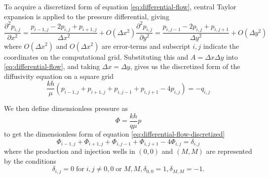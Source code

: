 To acquire a discretized form of equation \eqref{eq:differential-flow}, central Taylor expansion is applied to the pressure differential, giving
\begin{subequations}
    \begin{equation}
        \frac{\partial^2 p_{i,j}}{\partial x^2} = \frac{p_{i-1,j} -2p_{i,j} + p_{i+1,j}}{\Delta x^2} + O(\Delta x^2)
    \end{equation}
    \begin{equation}
        \frac{\partial^2 p_{i,j}}{\partial y^2} = \frac{p_{i,j-1} -2p_{i,j} + p_{i,j+1}}{\Delta y^2} + O(\Delta y^2)
    \end{equation}
\end{subequations}
where $O(\Delta x^2)$ and $O(\Delta x^2)$ are error-terms and subscript $i,j$ indicate the coordinates on the computational grid. Substituting this and $A=\Delta x \Delta y$ into \eqref{eq:differential-flow}, and taking $\Delta x = \Delta y$, gives us the discretized form of the diffusivity equation on a square grid
\begin{equation}
    \label{eq:differential-flow-discretized}
    \frac{kh}{\mu} \left( p_{i-1,j} + p_{i+1,j} + p_{i,j-1} + p_{i,j+1} -4p_{i,j} \right) = -q_{i,j}
\end{equation}

We then define dimensionless pressure as
\begin{equation}
    \label{eq:dimensionless-pressure}
    \Phi = \frac{kh}{q\mu} p
\end{equation}
to get the dimensionless form of equation \eqref{eq:differential-flow-discretized} \cite{Peaceman1978Interpretation}
\begin{equation}
    \label{eq:differential-flow-discretzed-dimensionless}
     \Phi_{i-1,j} + \Phi_{i+1,j} + \Phi_{i,j-1}  + \Phi_{i,j+1} -4 \Phi_{i,j}  = \delta_{i,j}
\end{equation}
where the production and injection wells in $(0,0)$ and $(M,M)$ are represented by the conditions
\begin{subequations}
    \label{eq:well-conditions}
    \begin{equation}
        \delta_{i,j} = 0 \;\mathrm{for}\; i,j \neq 0,0 \;\mathrm{or}\; M,M,
    \end{equation}    
    \begin{equation}
        \delta_{0,0} = 1,
    \end{equation}
    \begin{equation}
        \delta_{M,M} = -1.
    \end{equation}
\end{subequations}

